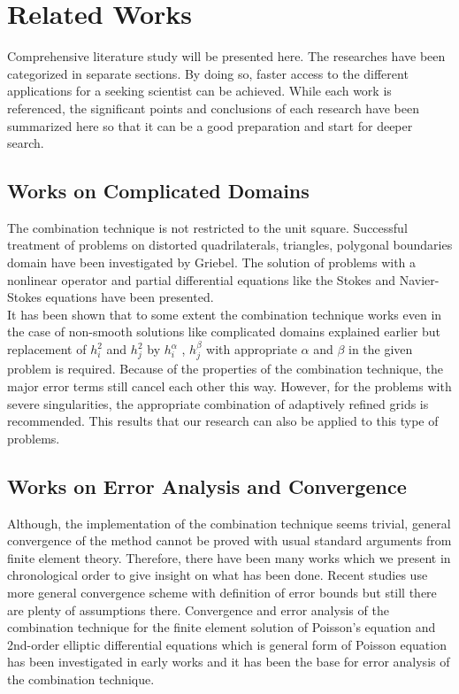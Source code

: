 \chapter{Related Works}
\label{chapter:relatedworks}
Comprehensive literature study will be presented here. The researches have been categorized in separate sections. By doing so, faster access to the different applications for a seeking scientist can be achieved. While each work is referenced, the significant points and conclusions of each research have been summarized here so that it can be a good preparation and start for deeper search.
\section{Works on Complicated Domains} 
The combination technique is not restricted to the unit square. Successful treatment of problems on distorted quadrilaterals, triangles, polygonal boundaries domain have been investigated by Griebel. The solution of problems with a nonlinear operator and partial differential equations like the Stokes and Navier-Stokes equations have been presented. \cite{Griebel1992a, Griebel:1993*3}\\

It has been shown that to some extent the combination technique works even in the case of non-smooth solutions like complicated domains explained earlier but replacement of ${h}^2_i$ and ${h}^2_j$ by ${h}^\alpha_i$ , ${h}^\beta_j$ with appropriate $\alpha$ and $\beta$ in the given problem is required. Because of the properties of the combination technique, the major error terms still cancel each other this way. However, for the problems with severe singularities, the appropriate combination of adaptively refined grids is recommended\cite{Griebel1992a}. This results that our research can also be applied to this type of problems.
\section{Works on Error Analysis and Convergence} 
Although, the implementation of the combination technique seems trivial, general convergence of the method cannot be proved with usual standard arguments from finite element theory. Therefore, there have been many works which we present in chronological order to give insight on what has been done. Recent studies \cite{Reisinger2013} use more general convergence scheme with definition of error bounds but still there are plenty of assumptions there.
Convergence  and error analysis of the combination technique for the finite element solution of Poisson's equation and 2nd-order elliptic differential equations which is general form of Poisson equation has been investigated in early works and it has been the base for error analysis of the combination technique.\cite{Pflaum1993, Pflaum1997}\\

